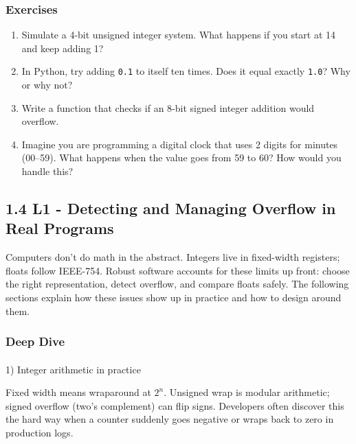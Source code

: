 \documentclass[
  letterpaper,
  DIV=11,
  numbers=noendperiod]{scrreprt}
\makeatletter
\let\oldparagraph\paragraph
\renewcommand{\paragraph}{
    \@ifstar
      \xxxParagraphStar
      \xxxParagraphNoStar
  }
\newcommand{\xxxParagraphStar}[1]{\oldparagraph*{#1}\mbox{}}
\newcommand{\xxxParagraphNoStar}[1]{\oldparagraph{#1}\mbox{}}
\providecommand{\tightlist}{%
  \setlength{\itemsep}{0pt}\setlength{\parskip}{0pt}}
\makeatother
\begin{document}
\subsubsection{Exercises}\label{exercises-9}

\begin{enumerate}
\def\labelenumi{\arabic{enumi}.}
\tightlist
\item
  Simulate a 4-bit unsigned integer system. What happens if you start at
  14 and keep adding 1?
\item
  In Python, try adding \texttt{0.1} to itself ten times. Does it equal
  exactly \texttt{1.0}? Why or why not?
\item
  Write a function that checks if an 8-bit signed integer addition would
  overflow.
\item
  Imagine you are programming a digital clock that uses 2 digits for
  minutes (00--59). What happens when the value goes from 59 to 60? How
  would you handle this?
\end{enumerate}

\subsection{1.4 L1 - Detecting and Managing Overflow in Real
Programs}\label{l1---detecting-and-managing-overflow-in-real-programs}

Computers don't do math in the abstract. Integers live in fixed-width
registers; floats follow IEEE-754. Robust software accounts for these
limits up front: choose the right representation, detect overflow, and
compare floats safely. The following sections explain how these issues
show up in practice and how to design around them.

\subsubsection{Deep Dive}\label{deep-dive-1}

\paragraph{1) Integer arithmetic in
practice}\label{integer-arithmetic-in-practice}

Fixed width means wraparound at \(2^{n}\). Unsigned wrap is modular
arithmetic; signed overflow (two's complement) can flip signs.
Developers often discover this the hard way when a counter suddenly goes
negative or wraps back to zero in production logs.
\end{document}
